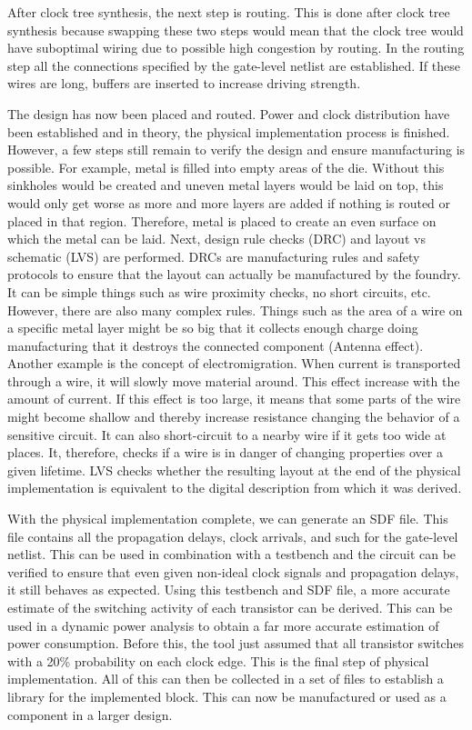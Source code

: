 After clock tree synthesis, the next step is routing. This is done after clock tree synthesis because swapping these two steps would mean that the clock tree would have suboptimal wiring due to possible high congestion by routing. In the routing step all the connections specified by the gate-level netlist are established. If these wires are long, buffers are inserted to increase driving strength.

The design has now been placed and routed. Power and clock distribution have been established and in theory, the physical implementation process is finished. However, a few steps still remain to verify the design and ensure manufacturing is possible. For example, metal is filled into empty areas of the die. Without this sinkholes would be created and uneven metal layers would be laid on top, this would only get worse as more and more layers are added if nothing is routed or placed in that region. Therefore, metal is placed to create an even surface on which the metal can be laid. Next, design rule checks (DRC) and layout vs schematic (LVS) are performed. DRCs are manufacturing rules and safety protocols to ensure that the layout can actually be manufactured by the foundry. It can be simple things such as wire proximity checks, no short circuits, etc. However, there are also many complex rules. Things such as the area of a wire on a specific metal layer might be so big that it collects enough charge doing manufacturing that it destroys the connected component (Antenna effect). Another example is the concept of electromigration. When current is transported through a wire, it will slowly move material around. This effect increase with the amount of current. If this effect is too large, it means that some parts of the wire might become shallow and thereby increase resistance changing the behavior of a sensitive circuit. It can also short-circuit to a nearby wire if it gets too wide at places. It, therefore, checks if a wire is in danger of changing properties over a given lifetime. LVS checks whether the resulting layout at the end of the physical implementation is equivalent to the digital description from which it was derived.

With the physical implementation complete, we can generate an SDF file. This file contains all the propagation delays, clock arrivals, and such for the gate-level netlist. This can be used in combination with a testbench and the circuit can be verified to ensure that even given non-ideal clock signals and propagation delays, it still behaves as expected. Using this testbench and SDF file, a more accurate estimate of the switching activity of each transistor can be derived. This can be used in a dynamic power analysis to obtain a far more accurate estimation of power consumption. Before this, the tool just assumed that all transistor switches with a 20\% probability on each clock edge. This is the final step of physical implementation. All of this can then be collected in a set of files to establish a library for the implemented block. This can now be manufactured or used as a component in a larger design. 





